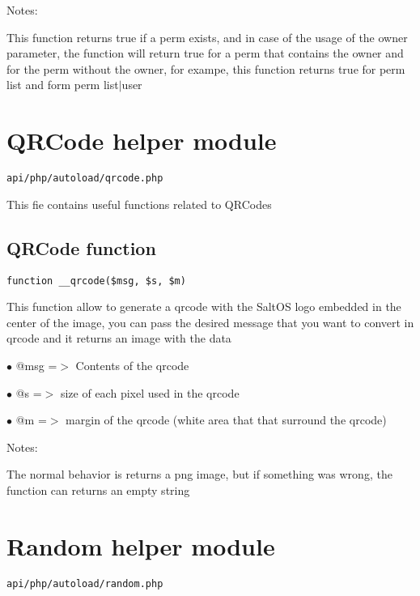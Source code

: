 \documentclass[a4paper]{book}
\begin{document}
Notes:

This function returns true if a perm exists, and in case of the usage
of the owner parameter, the function will return true for a perm that
contains the owner and for the perm without the owner, for exampe, this
function returns true for perm list and form perm list$|$user

\hypertarget{toc224}{}
\section{QRCode helper module}

\begin{lstlisting}
api/php/autoload/qrcode.php
\end{lstlisting}

This fie contains useful functions related to QRCodes

\hypertarget{toc225}{}
\subsection{QRCode function}

\begin{lstlisting}
function __qrcode($msg, $s, $m)
\end{lstlisting}

This function allow to generate a qrcode with the SaltOS logo embedded
in the center of the image, you can pass the desired message that you
want to convert in qrcode and it returns an image with the data

\begin{compactitem}
\item[\color{myblue}$\bullet$] @msg =$>$ Contents of the qrcode
\item[\color{myblue}$\bullet$] @s   =$>$ size of each pixel used in the qrcode
\item[\color{myblue}$\bullet$] @m   =$>$ margin of the qrcode (white area that that surround the qrcode)
\end{compactitem}

Notes:

The normal behavior is returns a png image, but if something was wrong,
the function can returns an empty string

\hypertarget{toc226}{}
\section{Random helper module}

\begin{lstlisting}
api/php/autoload/random.php
\end{lstlisting}
\end{document}
